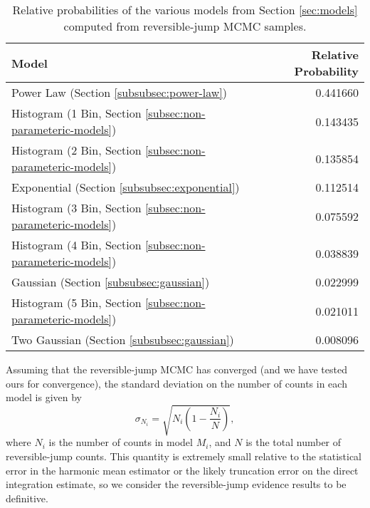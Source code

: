 \documentclass[preprint]{aastex}
\begin{document}
\begin{table}
  \begin{center}
    \begin{tabular}{|l|r|}
      \hline
      Model & Relative Probability \\
      \hline \hline
      Power Law (Section \ref{subsubsec:power-law}) & 0.441660 \\
      \hline
      Histogram (1 Bin, Section \ref{subsec:non-parameteric-models}) &
      0.143435 \\
      \hline
      Histogram (2 Bin, Section \ref{subsec:non-parameteric-models}) &
      0.135854 \\
      \hline 
      Exponential (Section \ref{subsubsec:exponential}) & 0.112514 \\
      \hline
      Histogram (3 Bin, Section \ref{subsec:non-parameteric-models}) &
      0.075592 \\
      \hline
      Histogram (4 Bin, Section \ref{subsec:non-parameteric-models}) &
      0.038839 \\
      \hline 
      Gaussian (Section \ref{subsubsec:gaussian}) & 0.022999 \\ 
      \hline
      Histogram (5 Bin, Section \ref{subsec:non-parameteric-models}) &
      0.021011 \\
      \hline      
      Two Gaussian (Section \ref{subsubsec:gaussian}) & 0.008096 \\
      \hline
    \end{tabular}
  \end{center}
  \caption{\label{tab:rj} Relative probabilities of the various models
    from Section \ref{sec:models} computed from reversible-jump
    MCMC samples.}
\end{table}

Assuming that the reversible-jump MCMC has converged (and we have
tested ours for convergence), the standard deviation on the number of
counts in each model is given by
\begin{equation}
  \sigma_{N_i} = \sqrt{N_i \left( 1 - \frac{N_i}{N} \right)},
\end{equation}
where $N_i$ is the number of counts in model $M_i$, and $N$ is the
total number of reversible-jump counts.  This quantity is extremely
small relative to the statistical error in the harmonic mean estimator
or the likely truncation error on the direct integration estimate, so
we consider the reversible-jump evidence results to be definitive.
\end{document}
